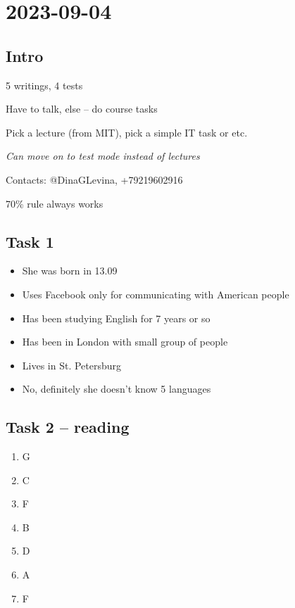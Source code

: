 \pagebreak
\section{2023-09-04}

\subsection{Intro}

5 writings, 4 tests

Have to talk, else -- do course tasks

Pick a lecture (from MIT), pick a simple IT task or etc.

\textit{Can move on to test mode instead of lectures}

Contacts: @DinaGLevina, +79219602916

70\% rule always works

\subsection{Task 1}

\begin{itemize}
	\item She was born in 13.09
	\item Uses Facebook only for communicating with American people
	\item Has been studying English for 7 years or so
	\item Has been in London with small group of people
	\item Lives in St. Petersburg
	\item No, definitely she doesn't know 5 languages
\end{itemize}

\subsection{Task 2 -- reading}

\begin{enumerate}
	\item G
	\item C
	\item F
	\item B
	\item D
	\item A
	\item F
\end{enumerate}
